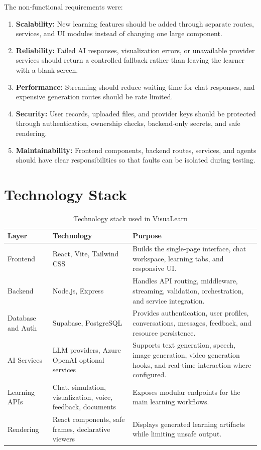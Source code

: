 The non-functional requirements were:
\begin{enumerate}[leftmargin=1.2cm]
\item \textbf{Scalability:} New learning features should be added through separate routes, services, and UI modules instead of changing one large component.
\item \textbf{Reliability:} Failed AI responses, visualization errors, or unavailable provider services should return a controlled fallback rather than leaving the learner with a blank screen.
\item \textbf{Performance:} Streaming should reduce waiting time for chat responses, and expensive generation routes should be rate limited.
\item \textbf{Security:} User records, uploaded files, and provider keys should be protected through authentication, ownership checks, backend-only secrets, and safe rendering.
\item \textbf{Maintainability:} Frontend components, backend routes, services, and agents should have clear responsibilities so that faults can be isolated during testing.
\end{enumerate}

\section{Technology Stack}

\begin{table}[H]
\centering
\begin{tabular}{|p{3.4cm}|p{4.2cm}|p{6.2cm}|}
\hline
\textbf{Layer} & \textbf{Technology} & \textbf{Purpose} \\
\hline
Frontend & React, Vite, Tailwind CSS & Builds the single-page interface, chat workspace, learning tabs, and responsive UI. \\
\hline
Backend & Node.js, Express & Handles API routing, middleware, streaming, validation, orchestration, and service integration. \\
\hline
Database and Auth & Supabase, PostgreSQL & Provides authentication, user profiles, conversations, messages, feedback, and resource persistence. \\
\hline
AI Services & LLM providers, Azure OpenAI optional services & Supports text generation, speech, image generation, video generation hooks, and real-time interaction where configured. \\
\hline
Learning APIs & Chat, simulation, visualization, voice, feedback, documents & Exposes modular endpoints for the main learning workflows. \\
\hline
Rendering & React components, safe frames, declarative viewers & Displays generated learning artifacts while limiting unsafe output. \\
\hline
\end{tabular}
\caption{Technology stack used in VisuaLearn}
\label{tab:technology-stack}
\end{table}

